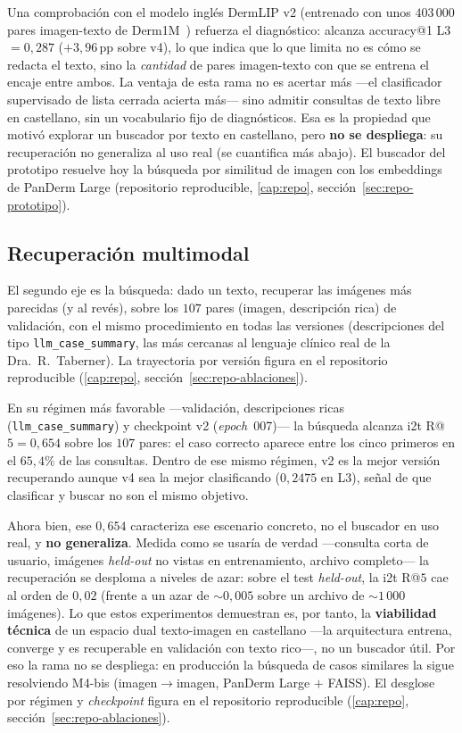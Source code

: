 Una comprobación con el modelo inglés DermLIP v2 (entrenado con unos
$403\,000$ pares imagen-texto de Derm1M~\cite{derm1m}) refuerza el
diagnóstico: alcanza accuracy@1 L3 $= 0{,}287$ ($+3{,}96$\,pp sobre v4),
lo que indica que lo que limita no es cómo se redacta el texto, sino la
\emph{cantidad} de pares imagen-texto con que se entrena el encaje entre
ambos. La ventaja de esta rama no es acertar más ---el clasificador
supervisado de lista cerrada acierta más--- sino admitir consultas de
texto libre en castellano, sin un vocabulario fijo de diagnósticos. Esa
es la propiedad que motivó explorar un buscador por texto en castellano,
pero \textbf{no se despliega}: su recuperación no generaliza al uso real
(se cuantifica más abajo). El buscador del prototipo resuelve hoy la
búsqueda por similitud de imagen con los embeddings de PanDerm Large
(repositorio reproducible, \ref{cap:repo},
sección~\ref{sec:repo-prototipo}).

\subsection{Recuperación multimodal}

El segundo eje es la búsqueda: dado un texto, recuperar las imágenes más
parecidas (y al revés), sobre los $107$ pares (imagen, descripción rica)
de validación, con el mismo procedimiento en todas las versiones
(descripciones del tipo \texttt{llm\_case\_summary}, las más cercanas al
lenguaje clínico real de la Dra.~R.~Taberner). La trayectoria por versión
figura en el repositorio reproducible
(\ref{cap:repo}, sección~\ref{sec:repo-ablaciones}).

En su régimen más favorable ---validación, descripciones ricas
(\texttt{llm\_case\_summary}) y checkpoint v2 (\emph{epoch}~007)--- la
búsqueda alcanza i2t R@$5 = 0{,}654$ sobre los $107$ pares: el caso
correcto aparece entre los cinco primeros en el $65{,}4\%$ de las
consultas. Dentro de ese mismo régimen, v2 es la mejor versión recuperando
aunque v4 sea la mejor clasificando ($0{,}2475$ en L3), señal de que
clasificar y buscar no son el mismo objetivo.

Ahora bien, ese $0{,}654$ caracteriza ese escenario concreto, no el
buscador en uso real, y \textbf{no generaliza}. Medida como se usaría de
verdad ---consulta corta de usuario, imágenes \emph{held-out} no vistas en
entrenamiento, archivo completo--- la recuperación se desploma a niveles
de azar: sobre el test \emph{held-out}, la i2t R@$5$ cae al orden de
$0{,}02$ (frente a un azar de $\sim 0{,}005$ sobre un archivo de
$\sim 1\,000$ imágenes). Lo que estos experimentos demuestran es, por
tanto, la \textbf{viabilidad técnica} de un espacio dual texto-imagen en
castellano ---la arquitectura entrena, converge y es recuperable en
validación con texto rico---, no un buscador útil. Por eso la rama no se
despliega: en producción la búsqueda de casos similares la sigue
resolviendo M4-bis (imagen$\to$imagen, PanDerm Large $+$ FAISS). El
desglose por régimen y \emph{checkpoint} figura en el repositorio
reproducible (\ref{cap:repo}, sección~\ref{sec:repo-ablaciones}).

